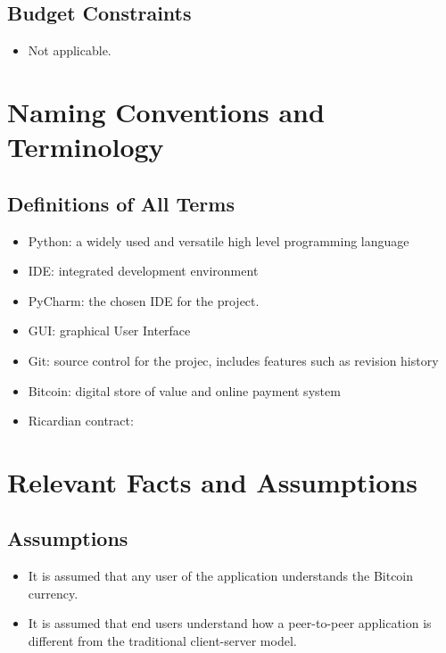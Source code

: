 \documentclass{article}
\begin{document}
\subsection{Budget Constraints}
\begin{itemize}
	
\item
Not applicable.
	
\end{itemize}

\section{Naming Conventions and Terminology}
\subsection{Definitions of All Terms}
\begin{itemize}
	
\item
Python: a widely used and versatile high level programming language
\item
IDE: integrated development environment
\item
PyCharm: the chosen IDE for the project.	
\item
GUI: graphical User Interface
\item
Git: source control for the projec, includes features such as revision history
\item
Bitcoin: digital store of value and online payment system
\item
Ricardian contract: 

\end{itemize}

\section{Relevant Facts and Assumptions}


\subsection{Assumptions}
\begin{itemize}
	
\item
It is assumed that any user of the application understands the Bitcoin currency.

\item
It is assumed that end users understand how a peer-to-peer application is different from the traditional client-server model.
\end{itemize}
\end{document}
